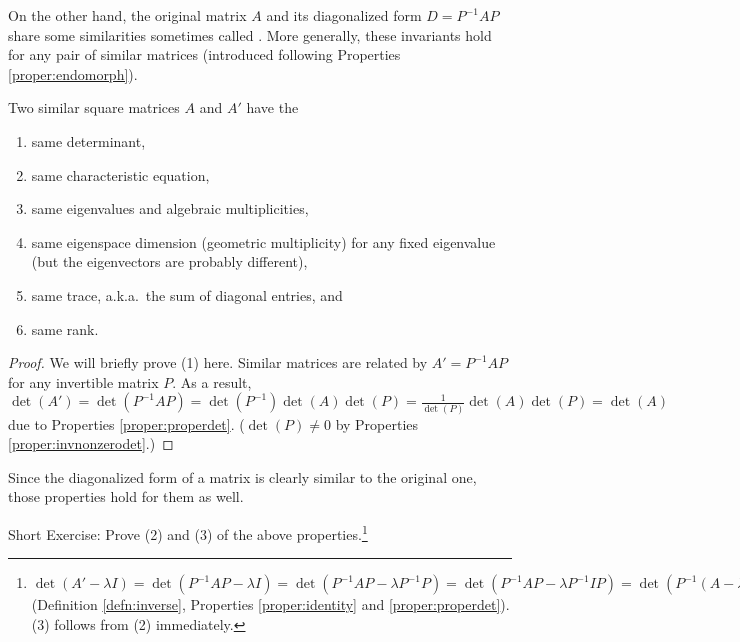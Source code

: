 On the other hand, the original matrix $A$ and its diagonalized form $D = P^{-1}AP$ share some similarities sometimes called . More generally, these invariants hold for any pair of similar matrices (introduced following Properties \ref{proper:endomorph}). 
\begin{proper}
\label{proper:similarinvariant}
Two similar square matrices $A$ and $A'$ have the
\begin{enumerate}
\item same determinant, 
\item same characteristic equation,
\item same eigenvalues and algebraic multiplicities,
\item same eigenspace dimension (geometric multiplicity) for any fixed eigenvalue (but the eigenvectors are probably different),
\item same trace, a.k.a.\ the sum of diagonal entries, and
\item same rank.
\end{enumerate}
\end{proper}
\begin{proof}
We will briefly prove (1) here. Similar matrices are related by $A' = P^{-1}AP$ for any invertible matrix $P$. As a result, $\det(A') = \det(P^{-1}AP) = \det(P^{-1})\det(A)\det(P) = \frac{1}{\det(P)}\det(A)\det(P) = \det(A)$ due to Properties \ref{proper:properdet}. ($\det(P) \neq 0$ by Properties \ref{proper:invnonzerodet}.)
\end{proof}
Since the diagonalized form of a matrix is clearly similar to the original one, those properties hold for them as well.\par
Short Exercise: Prove (2) and (3) of the above properties.\footnote{$\det(A'-\lambda I) = \det(P^{-1}AP-\lambda I) = \det(P^{-1}AP-\lambda P^{-1}P) = \det(P^{-1}AP-\lambda P^{-1}IP) = \det(P^{-1}(A-\lambda I)P) = \det(P^{-1})\det(A-\lambda I)\det(P) = \det(A-\lambda I)$ (Definition \ref{defn:inverse}, Properties \ref{proper:identity} and \ref{proper:properdet}). (3) follows from (2) immediately.}\par

